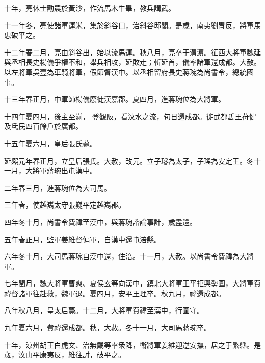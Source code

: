 \begin{pinyinscope}
 
 
 
 十年，亮休士勸農於黃沙，作流馬木牛畢，教兵講武。
 
 
 
 
 十一年冬，亮使諸軍運米，集於斜谷口，治斜谷邸閣。是歲，南夷劉冑反，將軍馬忠破平之。
 
 
 
 
 十二年春二月，亮由斜谷出，始以流馬運。秋八月，亮卒于渭濵。征西大將軍魏延與丞相長史楊儀爭權不和，舉兵相攻，延敗走；斬延首，儀率諸軍還成都。大赦。以左將軍吳壹為車騎將軍，假節督漢中。以丞相留府長史蔣琬為尚書令，總統國事。
 
 
 
 
 十三年春正月，中軍師楊儀廢徙漢嘉郡。夏四月，進蔣琬位為大將軍。
 
 
十四年夏四月，後主至湔，
 登觀阪，看汶水之流，旬日還成都。徙武都氐王苻健及氐民四百餘戶於廣都。
 
 
 
 
 十五年夏六月，皇后張氏薨。
 
 
 
 
 延熈元年春正月，立皇后張氏。大赦，改元。立子璿為太子，子瑤為安定王。冬十一月，大將軍蔣琬出屯漢中。
 
 
 
 
 二年春三月，進蔣琬位為大司馬。
 
 
 
 
 三年春，使越嶲太守張嶷平定越嶲郡。
 
 
 
 
 四年冬十月，尚書令費禕至漢中，與蔣琬諮論事計，歲盡還。
 
 
 
 
 五年春正月，監軍姜維督偏軍，自漢中還屯涪縣。
 
 
 
 
 六年冬十月，大司馬蔣琬自漢中還，住涪。十一月，大赦。以尚書令費禕為大將軍。
 
 
 
 
 七年閏月，魏大將軍曹爽、夏侯玄等向漢中，鎮北大將軍王平拒興勢圍，大將軍費禕督諸軍往赴救，魏軍退。夏四月，安平王理卒。秋九月，禕還成都。
 
 
 
 
 八年秋八月，皇太后薨。十二月，大將軍費禕至漢中，行圍守。
 
 
九年夏六月，費禕還成都。秋，大赦。冬十一月，大司馬蔣琬卒。
 
 
 
 
 十年，涼州胡王白虎文、治無戴等率衆降，衞將軍姜維迎逆安撫，居之于繁縣。是歲，汶山平康夷反，維往討，破平之。
 

\end{pinyinscope}
